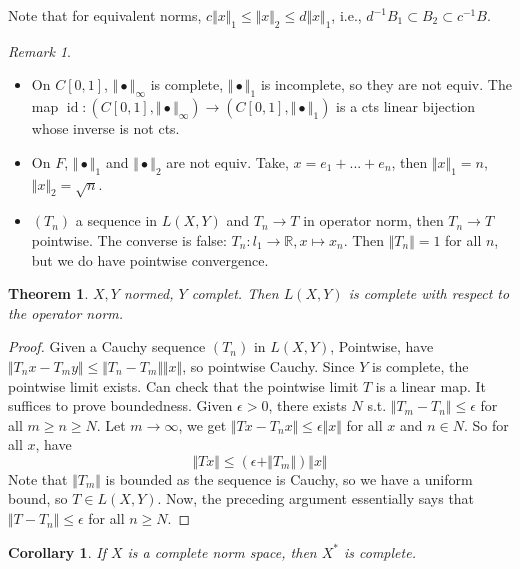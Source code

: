 \documentclass{article}
\theoremstyle{definition}
\theoremstyle{remark}
\newtheorem{rem}{Remark}
\theoremstyle{plain}
\newtheorem{thm}[defn]{Theorem}
\newtheorem{crly}[defn]{Corollary}
\newcommand{\RR}{\mathbb{R}}
\begin{document}
Note that for equivalent norms, $c\Vert x\Vert_1\le \Vert x\Vert_2\le d\Vert x\Vert_1$, i.e., $d^{-1}B_1\subset B_2\subset c^{-1}B$.
\begin{rem}
    \begin{itemize}
        \item On $C[0,1]$, $\Vert\bullet\Vert_\infty$ is complete, $\Vert\bullet\Vert_1$ is incomplete, so they are not equiv. The map $\operatorname{id}:(C[0,1],\Vert\bullet\Vert_\infty)\to(C[0,1],\Vert\bullet\Vert_1)$ is a cts linear bijection whose inverse is not cts.
        \item On $F$, $\Vert\bullet\Vert_1$ and $\Vert\bullet\Vert_2$ are not equiv. Take, $x=e_1+...+e_n$, then $\Vert x\Vert_1=n$, $\Vert x\Vert_2=\sqrt{n}$.
        \item $(T_n)$ a sequence in $L(X,Y)$ and $T_n\to T$ in operator norm, then $T_n\to T$ pointwise.
        The converse is false: $T_n:l_1\to \RR, x\mapsto x_n$. Then $\Vert T_n\Vert=1$ for all $n$, but we do have pointwise convergence.
    \end{itemize}
\end{rem}
\begin{thm}
    $X,Y$ normed, $Y$ complet. Then $L(X,Y)$ is complete with respect to the operator norm.
\end{thm}
\begin{proof}
    Given a Cauchy sequence $(T_n)$ in $L(X,Y)$, Pointwise, have
    $\Vert T_nx-T_my\Vert\le \Vert T_n-T_m\Vert\Vert x\Vert$, so pointwise Cauchy. Since $Y$ is complete, the pointwise limit exists. Can check that the pointwise limit $T$ is a linear map. It suffices to prove boundedness. Given $\epsilon>0$, there exists $N$ s.t. $\Vert T_m- T_n\Vert\le \epsilon$ for all $m\ge n\ge N$. Let $m\to \infty$, we get $\Vert Tx-T_nx\Vert\le\epsilon\Vert x\Vert$ for all $x$ and $n\in N$. So for all $x$, have
    \[\Vert Tx\Vert\le (\epsilon+\Vert T_m\Vert)\Vert x\Vert\]
    Note that $\Vert T_m\Vert$ is bounded as the sequence is Cauchy, so we have a uniform bound, so $T\in L(X,Y)$. Now, the preceding argument essentially says that $\Vert T-T_n\Vert\le\epsilon$ for all $n\ge N$.
\end{proof}
\begin{crly}
    If $X$ is a complete norm space, then $X^\ast$ is complete.
\end{crly}
\end{document}
